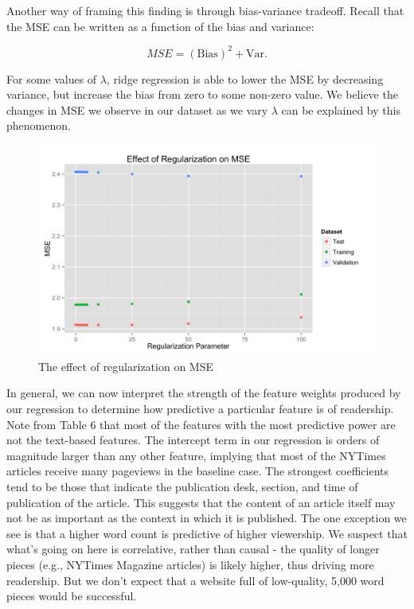 \documentclass[fleqn,12pt]{SelfArx} %
\begin{document}
Another way of framing this finding is through bias-variance tradeoff. Recall that the MSE can be written as a function of the bias and variance:

\begin{equation}
MSE = (\textrm{Bias})^2 + \textrm{Var}.
\end{equation}

\noindent For some values of $\lambda$, ridge regression is able to lower the MSE by decreasing variance, but increase the bias from zero to some non-zero value. We believe the changes in MSE we observe in our dataset as we vary $\lambda$ can be explained by this phenomenon.

\begin{figure}[ht]\centering
\includegraphics[width=\linewidth]{mse_plot.png}
\caption{The effect of regularization on MSE}
\label{fig:mse_plot}
\end{figure}

In general, we can now interpret the strength of the feature weights produced by our regression to determine how predictive a particular feature is of readership. Note from Table 6 that most of the features with the most predictive power are not the text-based features. The intercept term in our regression is orders of magnitude larger than any other feature, implying that most of the NYTimes articles receive many pageviews in the baseline case. The strongest coefficients tend to be those that indicate the publication desk, section, and time of publication of the article. This suggests that the content of an article itself may not be as important as the context in which it is published. The one exception we see is that a higher word count is predictive of higher viewership. We suspect that what's going on here is correlative, rather than causal - the quality of longer pieces (e.g., NYTimes Magazine articles) is likely higher, thus driving more readership. But we don't expect that a website full of low-quality, 5,000 word pieces would be successful.
\end{document}
